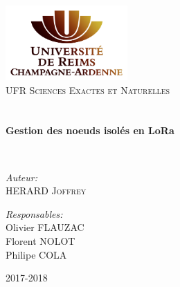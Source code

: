 \begin{titlepage}
\begin{center}

\includegraphics[width=0.35\textwidth]{./logo}~\\[1cm]

\textsc{\LARGE UFR Sciences Exactes et Naturelles}\\[1.5cm]

\textsc{\Large }\\[0.5cm]

\HRule \\[0.4cm]

{\huge \bfseries  
Gestion des noeuds isolés en LoRa\\[0.4cm] }

\HRule \\[1.5cm]

\begin{minipage}{0.4\textwidth}
\begin{flushleft} \large
\emph{Auteur:}\\
HERARD \textsc{Joffrey}\\
\end{flushleft}
\end{minipage}
\begin{minipage}{0.4\textwidth}
\begin{flushright} \large
\emph{Responsables:} \\
Olivier \textsc{FLAUZAC}\\
Florent \textsc{NOLOT}\\
Philipe \textsc{COLA}\\
\end{flushright}
\end{minipage}

\vfill

{\large 2017-2018}

\end{center}
\end{titlepage}
